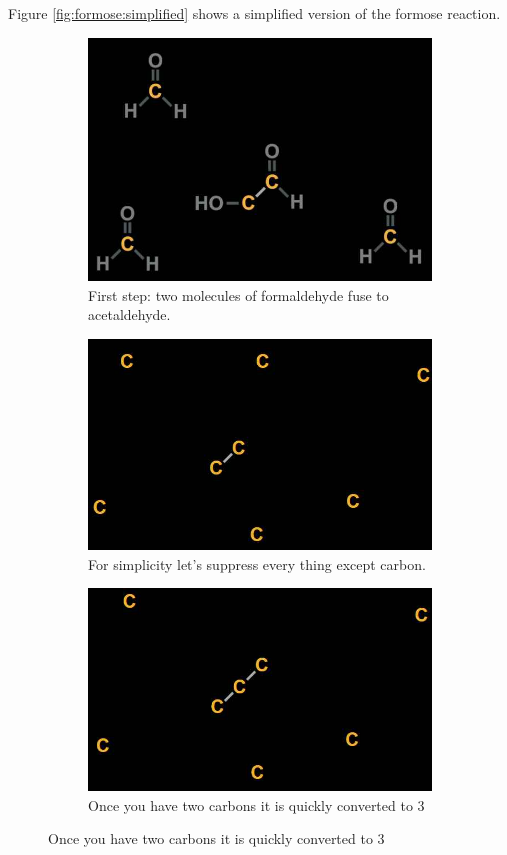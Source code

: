 \documentclass[]{article}
\begin{document}
Figure \ref{fig:formose:simplified} shows a simplified version of the formose reaction.
\begin{figure}[H]
	\caption{The Formose Reaction(simplified)}\label{fig:formose:simplified}
	\begin{subfigure}[h]{0.45\textwidth}
		\caption{First step: two molecules of formaldehyde fuse to acetaldehyde.}
		\includegraphics[width=\textwidth]{FormoseStep1}
	\end{subfigure}
	\begin{subfigure}[h]{0.45\textwidth}
		\caption{For simplicity let's suppress every thing except carbon.}
		\includegraphics[width=\textwidth]{FormoseStep1A}
	\end{subfigure}
	\begin{subfigure}[h]{0.45\textwidth}
		\caption{Once you have two carbons it is quickly converted to 3}
		\includegraphics[width=\textwidth]{FormoseStep2}

\end{subfigure}
\end{figure}
\end{document}
